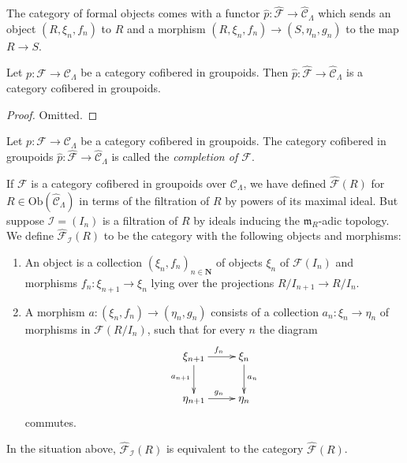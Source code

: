 \noindent
The category of formal objects comes with a functor $\widehat{p}: 
\widehat{\mathcal{F}} \to \widehat{\mathcal{C}}_\Lambda$ which sends an 
object $(R,\xi_n,f_n)$ to $R$ and a morphism $(R,\xi_n,f_n) \to 
(S,\eta_n,g_n)$ to the map $R \to S$.

\begin{lemma}
\label{lemma-completion-cofibred}
Let $p: \mathcal{F} \to \mathcal{C}_\Lambda$ be a category cofibered in 
groupoids.  Then $\widehat{p}: \widehat{\mathcal{F}} \to 
\widehat{\mathcal{C}}_\Lambda$ is a category cofibered in groupoids.
\end{lemma}

\begin{proof}
Omitted.
\end{proof}

\begin{definition}
\label{definition-completion}
Let $p: \mathcal{F} \to \mathcal{C}_\Lambda$ be a category cofibered in 
groupoids.  The category cofibered in groupoids $\widehat{p}: \widehat{\mathcal 
F} \to \widehat{\mathcal{C}}_\Lambda$ is called the
{\it completion of $\mathcal{F}$}.
\end{definition}

\noindent
If $\mathcal{F}$ is a category cofibered in groupoids over $\mathcal 
C_\Lambda$, we have defined $\widehat{\mathcal{F}}(R)$ for $R \in 
\text{Ob}(\widehat{\mathcal{C}}_\Lambda)$ in terms of the filtration of 
$R$ by powers of its maximal ideal.  But suppose $\mathcal I = (I_{n})$ is a 
filtration of $R$ by ideals inducing the $\mathfrak{m}_{R}$-adic topology.  We 
define $\widehat{\mathcal{F}}_{\mathcal I}(R)$ to be the category with the 
following objects and morphisms:
\begin{enumerate}
\item An object is a collection $(\xi_{n}, f_{n})_{n \in \mathbf{N}}$ of 
objects $\xi_{n}$ of $\mathcal{F}(I_{n})$ and morphisms $f_{n}: \xi_{n+1} 
\to \xi_{n}$ lying over the projections $R/I_{n+1} \to R/I_{n}$.
\item A morphism $a: (\xi_n,f_n) \to (\eta_n, g_n)$ consists of a 
collection $a_n: \xi_n \to \eta_n$ of morphisms in $\mathcal 
F(R/I_{n})$, such that for every $n$ the diagram
\[
\xymatrix{
\xi_{n+1} \ar[r]^{f_{n}} \ar[d]_{a_{n+1}} & \xi_{n} \ar[d]^{a_{n}} \\
\eta_{n+1} \ar[r]^{g_{n}} & \eta_{n} 
}
\]
commutes.
\end{enumerate}

\begin{lemma}
\label{lemma-formal-objects-different-filtration}
In the situation above, $\widehat{\mathcal{F}}_{\mathcal I}(R)$ is equivalent 
to the category $\widehat{\mathcal{F}}(R)$.
\end{lemma}

